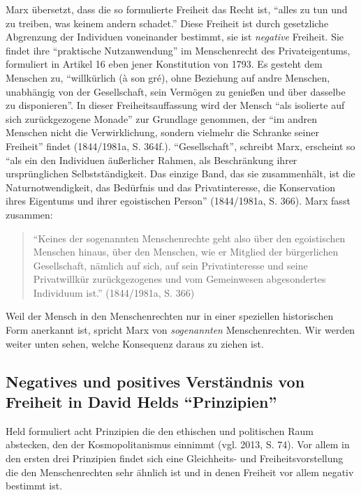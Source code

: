 \documentclass[ngerman,12pt, titlepage, smallheadings, nomath]{scrartcl}
\begin{document}
\noindent Marx übersetzt, dass die so formulierte Freiheit das Recht
ist, \enquote{alles zu tun und zu treiben, was keinem andern schadet.}
Diese Freiheit ist durch gesetzliche Abgrenzung der Individuen
voneinander bestimmt, sie ist \emph{negative} Freiheit. Sie findet ihre
\enquote{praktische Nutzanwendung} im Menschenrecht des Privateigentums,
formuliert in Artikel 16 eben jener Konstitution von 1793. Es gesteht
dem Menschen zu, \enquote{willkürlich (à son gré), ohne Beziehung auf
andre Menschen, unabhängig von der Gesellschaft, sein Vermögen zu
genießen und über dasselbe zu disponieren}. In dieser
Freiheitsauffassung wird der Mensch \enquote{als isolierte auf sich
zurückgezogene Monade} zur Grundlage genommen, der \enquote{im andren
Menschen nicht die Verwirklichung, sondern vielmehr die Schranke seiner
Freiheit} findet (1844/1981a, S. 364f.). \enquote{Gesellschaft},
schreibt Marx, erscheint so \enquote{als ein den Individuen äußerlicher
Rahmen, als Beschränkung ihrer ursprünglichen Selbstständigkeit. Das
einzige Band, das sie zusammenhält, ist die Naturnotwendigkeit, das
Bedürfnis und das Privatinteresse, die Konservation ihres Eigentums und
ihrer egoistischen Person} (1844/1981a, S. 366). Marx fasst zusammen:

\begin{quote}
\enquote{Keines der sogenannten Menschenrechte geht also über den
egoistischen Menschen hinaus, über den Menschen, wie er Mitglied der
bürgerlichen Gesellschaft, nämlich auf sich, auf sein Privatinteresse
und seine Privatwillkür zurückgezogenes und vom Gemeinwesen
abgesondertes Individuum ist.} (1844/1981a, S. 366)
\end{quote}

\noindent Weil der Mensch in den Menschenrechten nur in einer speziellen
historischen Form anerkannt ist, spricht Marx von \emph{sogenannten}
Menschenrechten. Wir werden weiter unten sehen, welche Konsequenz daraus
zu ziehen ist.

\subsection{\texorpdfstring{Negatives und positives Verständnis von
Freiheit in David Helds
\enquote{Prinzipien}}{Negatives und positives Verständnis von Freiheit in David Helds Prinzipien}}\label{negatives-und-positives-verstuxe4ndnis-von-freiheit-in-david-helds-prinzipien}

Held formuliert acht Prinzipien die den ethischen und politischen Raum
abstecken, den der Kosmopolitanismus einnimmt (vgl. 2013, S. 74). Vor
allem in den ersten drei Prinzipien findet sich eine Gleichheits- und
Freiheitsvorstellung die den Menschenrechten sehr ähnlich ist und in
denen Freiheit vor allem negativ bestimmt ist.
\end{document}

